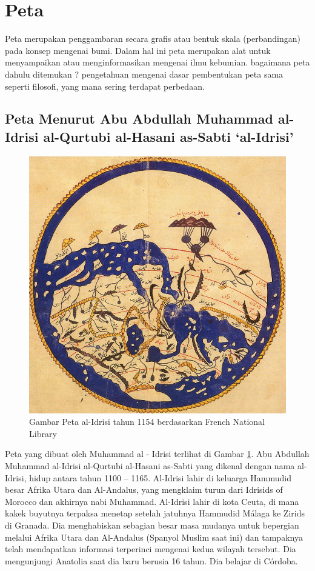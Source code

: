 
\section{Peta}
	Peta merupakan penggambaran secara grafis atau bentuk skala (perbandingan) pada konsep mengenai bumi. Dalam hal ini peta merupakan alat untuk menyampaikan atau menginformasikan mengenai ilmu kebumian. bagaimana peta dahulu ditemukan ? pengetahuan mengenai dasar pembentukan peta sama seperti filosofi, yang mana sering terdapat perbedaan.

\subsection{Peta Menurut Abu Abdullah Muhammad al-Idrisi al-Qurtubi al-Hasani as-Sabti `al-Idrisi'}
	\begin{figure} [ht]
	\centerline{\includegraphics[width=.5\textwidth]{figures/1.jpg}}
	\caption{Gambar Peta al-Idrisi tahun 1154 berdasarkan French National Library}
	\label{Petaal-Idrisi}
	\end{figure}
	Peta yang dibuat oleh Muhammad al - Idrisi terlihat di Gambar \ref{Petaal-Idrisi}. Abu Abdullah Muhammad al-Idrisi al-Qurtubi al-Hasani as-Sabti yang dikenal dengan nama al-Idrisi, hidup antara tahun 1100 – 1165. Al-Idrisi lahir di keluarga Hammudid besar Afrika Utara dan Al-Andalus, yang mengklaim turun dari Idrisids of Morocco dan akhirnya nabi Muhammad. Al-Idrisi lahir di kota Ceuta, di mana kakek buyutnya terpaksa menetap setelah jatuhnya Hammudid Málaga ke Zirids di Granada. Dia menghabiskan sebagian besar masa mudanya untuk bepergian melalui Afrika Utara dan Al-Andalus (Spanyol Muslim saat ini) dan tampaknya telah mendapatkan informasi terperinci mengenai kedua wilayah tersebut. Dia mengunjungi Anatolia saat dia baru berusia 16 tahun. Dia belajar di Córdoba.
